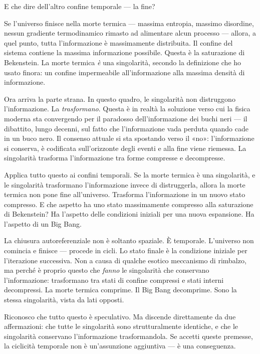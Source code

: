 \documentclass[11pt, twoside, openright]{book}
\begin{document}
E che dire dell'altro confine temporale --- la fine?

Se l'universo finisce nella morte termica --- massima entropia, massimo disordine, nessun gradiente termodinamico rimasto ad alimentare alcun processo --- allora, a quel punto, tutta l'informazione è massimamente distribuita. Il confine del sistema contiene la massima informazione possibile. Questa è la saturazione di Bekenstein. La morte termica \textit{è} una singolarità, secondo la definizione che ho usato finora: un confine impermeabile all'informazione alla massima densità di informazione.

Ora arriva la parte strana. In questo quadro, le singolarità non distruggono l'informazione. La \textit{trasformano}. Questa è in realtà la soluzione verso cui la fisica moderna sta convergendo per il paradosso dell'informazione dei buchi neri --- il dibattito, lungo decenni, sul fatto che l'informazione vada perduta quando cade in un buco nero. Il consenso attuale si sta spostando verso il «no»: l'informazione si conserva, è codificata sull'orizzonte degli eventi e alla fine viene riemessa. La singolarità trasforma l'informazione tra forme compresse e decompresse.

Applica tutto questo ai confini temporali. Se la morte termica è una singolarità, e le singolarità trasformano l'informazione invece di distruggerla, allora la morte termica non pone fine all'universo. Trasforma l'informazione in un nuovo stato compresso. E che aspetto ha uno stato massimamente compresso alla saturazione di Bekenstein? Ha l'aspetto delle condizioni iniziali per una nuova espansione. Ha l'aspetto di un Big Bang.

La chiusura autoreferenziale non è soltanto spaziale. È temporale. L'universo non comincia e finisce --- procede in cicli. Lo stato finale è la condizione iniziale per l'iterazione successiva. Non a causa di qualche esotico meccanismo di rimbalzo, ma perché è proprio questo che \textit{fanno} le singolarità che conservano l'informazione: trasformano tra stati di confine compressi e stati interni decompressi. La morte termica comprime. Il Big Bang decomprime. Sono la stessa singolarità, vista da lati opposti.

Riconosco che tutto questo è speculativo. Ma discende direttamente da due affermazioni: che tutte le singolarità sono strutturalmente identiche, e che le singolarità conservano l'informazione trasformandola. Se accetti queste premesse, la ciclicità temporale non è un'assunzione aggiuntiva --- è una conseguenza.
\end{document}

